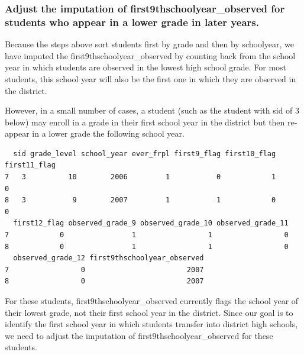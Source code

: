 \documentclass[12pt]{article}
\makeatletter
\newenvironment{kframe}{%
 \def\FrameCommand##1{\hskip\@totalleftmargin \hskip-\fboxsep
 \colorbox{shadecolor}{##1}\hskip-\fboxsep
     \hskip-\linewidth \hskip-\@totalleftmargin \hskip\columnwidth}%
 \MakeFramed {\advance\hsize-\width
   \@totalleftmargin\z@ \linewidth\hsize
   \@setminipage}}%
 {\par\unskip\endMakeFramed}
\newenvironment{knitrout}{}{} %
\renewenvironment{knitrout}{\begin{footnotesize}}{\end{footnotesize}}
\makeatother
\begin{document}
\subsubsection{Adjust the imputation of first9thschoolyear\_observed for students who appear in a lower grade in later years.} 
Because the steps above sort students first by grade and then by schoolyear, we have imputed the first9thschoolyear\_observed by 
counting back from the school year in which students are observed in the lowest high school grade. For most students, this 
school year will also be the first one in which they are observed in the district.

However, in a small number of cases, a student (such as the student with sid of 3 below) may enroll in a grade in their first 
school year in the district but then re-appear in a lower grade the following school year. 
\begin{knitrout}
\color{fgcolor}\begin{kframe}
\begin{verbatim}
  sid grade_level school_year ever_frpl first9_flag first10_flag first11_flag
7   3          10        2006         1           0            1            0
8   3           9        2007         1           1            0            0
  first12_flag observed_grade_9 observed_grade_10 observed_grade_11
7            0                1                 1                 0
8            0                1                 1                 0
  observed_grade_12 first9thschoolyear_observed
7                 0                        2007
8                 0                        2007
\end{verbatim}
\end{kframe}
\end{knitrout}


For these students, first9thschoolyear\_observed currently flags the school year of their lowest grade, not their 
first school year in the district. Since our goal is to identify the first school year in which students transfer into district high 
schools, we need to adjust the imputation of first9thschoolyear\_observed for these students.
\end{document}

